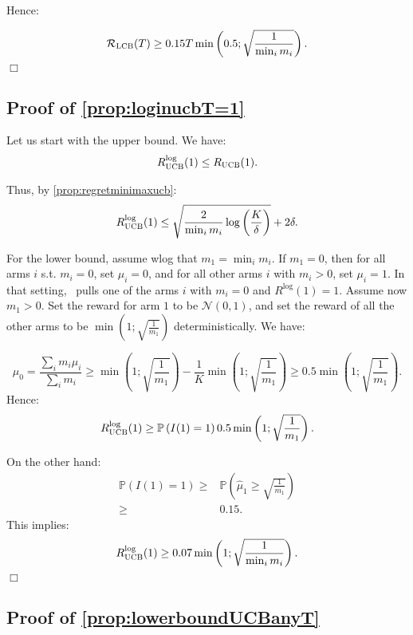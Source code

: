 Hence:

\begin{equation*}
\mathcal{R}_{\textsc{LCB}}(T)\geq 0.15 T\min\left(0.5;\sqrt{\frac{1}{\min_i m_i}}\right).
\end{equation*}
\hfill \(\Box\)

\subsection{Proof of \cref{prop:loginucbT=1}}


 Let us start with the upper bound. We have:
\begin{align*}
    R_\textsc{UCB}^{\text{log}}(1)\leq R_\textsc{UCB}(1).
\end{align*}

Thus, by \cref{prop:regretminimaxucb}:
\begin{align*}
    R_\textsc{UCB}^{\text{log}}(1)\leq \sqrt{\frac{2}{\min_i m_i}\log\left(\frac{K}{\delta}\right)}+2\delta.
\end{align*}


For the lower bound, assume wlog that $m_1=\min_i m_i$. If $m_1=0$, then for all arms $i$ s.t. $m_i=0$, set $\mu_i=0$, and for all other arms $i$ with $m_i>0$, set $\mu_i=1$. In that setting, \algucb\ pulls one of the arms $i$ with $m_i=0$ and $R^{\text{log}}(1)=1$. Assume now $m_1>0$.  Set the reward for arm $1$ to be $\mathcal{N}(0,1)$, and set the reward of all the other arms to be $\min \left(1;\sqrt{\frac{1}{m_1}}\right)$ deterministically. We have:

\[
\mu_0=\frac{\sum_i m_i \mu_i}{\sum_i m_i}\geq \min \left(1;\sqrt{\frac{1}{m_1}}\right) -\frac{1}{K} \min \left(1;\sqrt{\frac{1}{m_1}}\right) \geq 0.5\min \left(1;\sqrt{\frac{1}{m_1}}\right).
\]
Hence:
\[
  R_\textsc{UCB}^{\text{log}}(1)\geq \mathbb{P}\left(I(1)=1\right) 0.5 \min \left(1;\sqrt{\frac{1}{m_1}}\right).
\]

On the other hand:
\begin{align*}
    \mathbb{P}\left(I(1)=1\right)\geq &\mathbb{P}\left(\hat{\mu}_1\geq \sqrt{\frac{1}{m_1}}\right)\\
    \geq & 0.15.
\end{align*}
This implies:
\[
  R^{\text{log}}_\textsc{UCB}(1)\geq 0.07\min \left(1;\sqrt{\frac{1}{\min_i m_i}}\right).
\]
\hfill \(\Box\)

\subsection{Proof of \cref{prop:lowerboundUCBanyT}}

